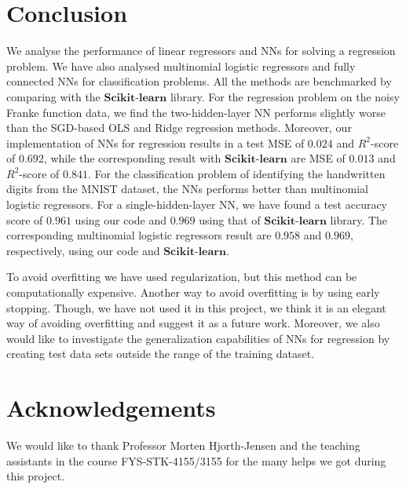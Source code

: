 \documentclass[a4paper]{article}
\begin{document}
\section{Conclusion}
We analyse the performance of linear regressors and NNs for solving a regression problem. We have also analysed multinomial logistic regressors and fully connected NNs for classification problems. All the methods are benchmarked by comparing with the $\mathbf{Scikit}$-$\mathbf{learn}$ library. For the regression problem on the noisy Franke function data, we find the two-hidden-layer NN performs slightly worse than the SGD-based OLS and Ridge regression methods. Moreover, our implementation of NNs for regression results in a test MSE of $0.024$ and $R^2$-score of $0.692$, while the corresponding result with $\mathbf{Scikit}$-$\mathbf{learn}$ are MSE of $0.013$ and $R^2$-score of $0.841$. For the classification problem of identifying the handwritten digits from the MNIST dataset, the NNs performs better than multinomial logistic regressors. For a single-hidden-layer NN, we have found a test accuracy score of $0.961$ using our code and $0.969$ using that of $\mathbf{Scikit}$-$\mathbf{learn}$ library. The corresponding multinomial logistic regressors result are $0.958$ and $0.969$, respectively, using our code and $\mathbf{Scikit}$-$\mathbf{learn}$.

To avoid overfitting we have used regularization, but this method can be computationally expensive. Another way to avoid overfitting is by using early stopping. Though, we have not used it in this project, we think it is an elegant way of avoiding overfitting and suggest it as a future work. Moreover, we also would like to investigate the generalization capabilities of NNs for regression by creating test data sets outside the range of the training dataset.

\section{Acknowledgements}
We would like to thank Professor Morten Hjorth-Jensen and the teaching assistants in the course FYS-STK-4155/3155 for the many helps we got during this project.

%
%


\end{document}
